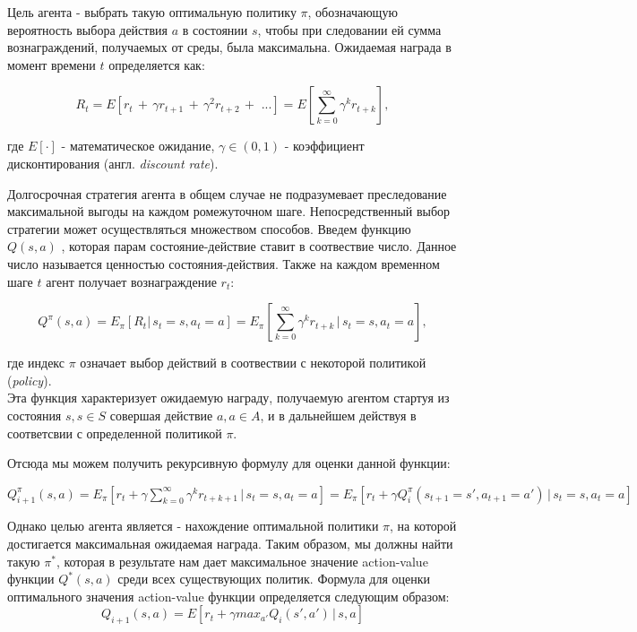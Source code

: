 \documentclass[12pt, a4paper]{report}
\theoremstyle{definition}
\theoremstyle{plain}
\theoremstyle{remark}
\theoremstyle{remark}
\theoremstyle{definition}
\begin{document}
Цель агента - выбрать такую оптимальную политику $\pi$, обозначающую вероятность выбора действия $a$ в состоянии $s$, чтобы при следовании ей сумма вознаграждений, получаемых от среды, была максимальна.
Ожидаемая награда в момент времени $t$ определяется как:

$$R_t = E[r_t \,+\, \gamma r_{t+1} \,+\, \gamma^2 r_{t+2}\, +\,\, ...] = E\left[\sum_{k=0}^{\infty}\gamma^kr_{t+k}\right],$$

где $E[\cdot]$ - математическое ожидание, $\gamma\in(0, 1)$ - коэффициент дисконтирования (англ. \textit{discount rate}).

Долгосрочная стратегия агента в общем случае не подразумевает преследование максимальной выгоды на каждом ромежуточном шаге. Непосредственный выбор стратегии может осуществляться множеством способов.
Введем функцию $Q(s,a)$ , которая парам состояние-действие ставит в соотвествие число. Данное число называется ценностью состояния-действия. Также на каждом временном шаге $ t $ агент получает вознаграждение $ r_{t} $:

$$Q^{\pi}(s, a) = E_{\pi}[R_t|\,s_t=s, a_t=a] = E_{\pi}\left[\sum_{k=0}^{\infty}\gamma^kr_{t+k}\,|\,s_t=s, a_t=a\right],$$

где индекс $\pi$ означает выбор действий в соотвествии с некоторой политикой (\textit{policy}).\\

Эта функция характеризует ожидаемую награду, получаемую агентом стартуя из состояния $s, s \in S$ совершая действие $a, a \in A$, и в дальнейшем действуя в соответсвии с определенной политикой $\pi$.

Отсюда мы можем получить рекурсивную формулу для оценки данной функции:\\

\begin{center}
	$Q_{i+1}^{\pi}(s, a) = E_{\pi}\left[r_t + \gamma\sum_{k=0}^{\infty}\gamma^kr_{t+k+1}\,|\,s_t=s, a_t=a\right] = E_{\pi}\left[r_t + \gamma Q_{i}^{\pi}(s_{t+1}=s', a_{t+1}=a')\,|\,s_t=s, a_t=a\right]$
\end{center}

Однако целью агента является - нахождение оптимальной политики $\pi$, на которой достигается максимальная ожидаемая награда. Таким образом, мы должны найти такую $\pi^*$, которая в результате нам дает максимальное значение action-value функции $Q^*(s, a)$ среди всех существующих политик. Формула для оценки оптимального значения action-value функции определяется следующим образом:
$$Q_{i+1}(s, a) = E[r_t + \gamma max_{a'}Q_i(s', a')\,|\,s, a]$$
\end{document}
